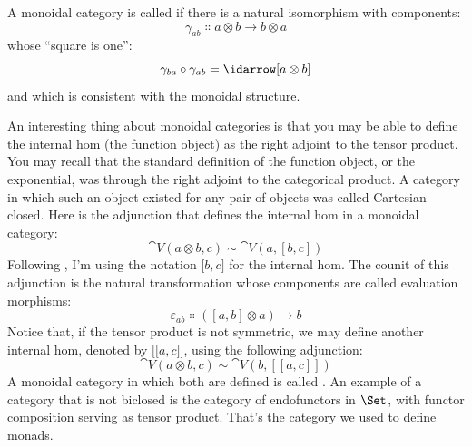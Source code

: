 \begin{figure}[H]
\centering
{}
\end{figure}

\begin{figure}[H]
\centering
{}
\end{figure}

\noindent
A monoidal category is called  if there is a natural
isomorphism with components:
\[\gamma_{a b} \Colon a \otimes b \to b \otimes a\]
whose ``square is one'':
\[\gamma_{b a} \circ \gamma_{a b} = \idarrow[a \otimes b]\]
and which is consistent with the monoidal structure.

An interesting thing about monoidal categories is that you may be able
to define the internal hom (the function object) as the right adjoint to
the tensor product. You may recall that the standard definition of the
function object, or the exponential, was through the right adjoint to
the categorical product. A category in which such an object existed for
any pair of objects was called Cartesian closed. Here is the adjunction
that defines the internal hom in a monoidal category:
\[\cat{V}(a \otimes b, c) \sim \cat{V}(a, [b, c])\]
Following
, I'm using the notation ${[}b, c{]}$ for the internal
hom. The counit of this adjunction is the natural transformation whose
components are called evaluation morphisms:
\[\varepsilon_{a b} \Colon ([a, b] \otimes a) \to b\]
Notice that, if the tensor product is not symmetric, we may define
another internal hom, denoted by ${[}{[}a, c{]}{]}$, using the
following adjunction:
\[\cat{V}(a \otimes b, c) \sim \cat{V}(b, [[a, c]])\]
A monoidal category in which both are defined is called . An
example of a category that is not biclosed is the category of
endofunctors in $\Set$, with functor composition serving as tensor
product. That's the category we used to define monads.

